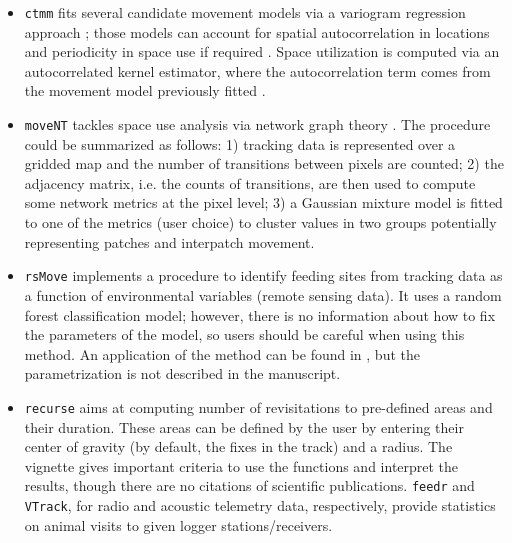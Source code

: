 \documentclass[a4paper,12pt]{article}
\newcommand{\Rpkg}[1]{\texttt{#1}}
\begin{document}
	\begin{itemize}
		\item \Rpkg{ctmm} fits several candidate movement models via a variogram regression approach \citep{Fleming2014}; those models can account for spatial autocorrelation in locations and periodicity in space use if required \citep{Peron2016}. Space utilization is computed via an autocorrelated kernel estimator, where the autocorrelation term comes from the movement model previously fitted \citep{Fleming2015}. 
		\item \Rpkg{moveNT} tackles space use analysis via network graph theory \citep{Bastille2018}. The procedure could be summarized as follows: 1) tracking data is represented over a gridded map and the number of transitions between pixels are counted; 2) the adjacency matrix, i.e. the counts of transitions, are then used to compute some network metrics at the pixel level; 3) a Gaussian mixture model is fitted to one of the metrics (user choice) to cluster values in two groups potentially representing patches and interpatch movement.
		\item \Rpkg{rsMove} implements a procedure to identify feeding sites from tracking data as a function of environmental variables (remote sensing data). It uses a random forest classification model; however, there is no information about how to fix the parameters of the model, so users should be careful when using this method. An application of the method can be found in \cite{Remelgado2017}, but the parametrization is not described in the manuscript.
		\item \Rpkg{recurse} aims at computing number of revisitations to pre-defined areas and their duration. These areas can be defined by the user by entering their center of gravity (by default, the fixes in the track) and a radius. The vignette gives important criteria to use the functions and interpret the results, though there are no citations of scientific publications.
		\Rpkg{feedr} and \Rpkg{VTrack}, for radio and acoustic telemetry data, respectively, provide statistics on animal visits to given logger stations/receivers. 
	\end{itemize}
	
\end{document}
